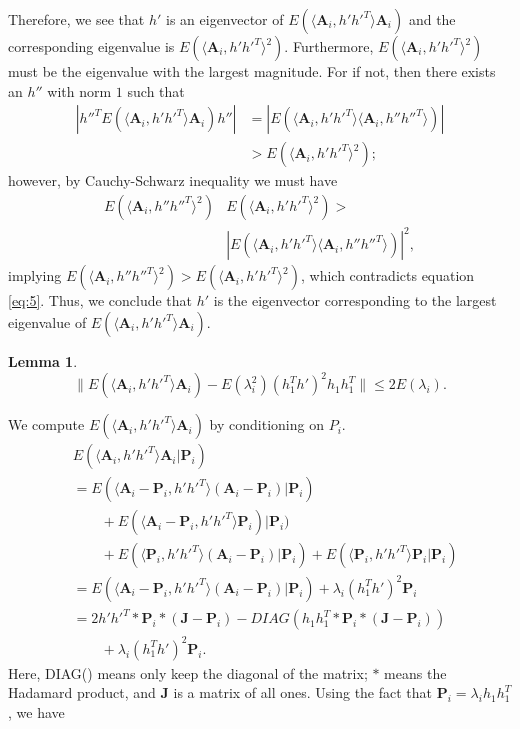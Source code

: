 \documentclass[10pt,journal,compsoc]{IEEEtran}
\newtheorem{lemma}[theorem]{Lemma}
\newenvironment{proof}[1][Proof]{\begin{trivlist}
		\item[\hskip \labelsep {\bfseries #1}]}{\end{trivlist}}
\newcommand{\bA}{\mathbf{A}}
\newcommand{\bP}{\mathbf{P}}
\newcommand{\bJ}{\mathbf{J}}
\begin{document}
\begin{proof} [Proof of Theorem 4.2]
\begin{equation}
	\end{equation}
	Therefore, we see that $h'$ is an eigenvector of $E(\langle \bA_{i},h' h'^T \rangle \bA_{i})$ and the corresponding eigenvalue is $E(\langle \bA_{i},h' h'^T \rangle ^2)$. Furthermore, $E(\langle \bA_{i},h' h'^T \rangle ^2)$ must be the eigenvalue with the largest magnitude. For if not, then there exists an $h''$ with norm $1$ such that
	\begin{align*}  | h''^T E(\langle \bA_{i},h' h'^T \rangle \bA_{i}) h''| &= |E(\langle \bA_{i},h' h'^T \rangle \langle \bA_{i},h'' h''^T \rangle)| \\
	&> E(\langle \bA_{i},h' h'^T \rangle ^2);
	\end{align*}
	however, by Cauchy-Schwarz inequality we must have
	\begin{align*} E(\langle \bA_{i},h'' h''^T \rangle^2) & E(\langle \bA_{i},h' h'^T \rangle^2) > \\
	&|E(\langle \bA_{i},h' h'^T \rangle \langle \bA_{i},h'' h''^T \rangle)|^2,
	\end{align*}
	implying $E(\langle \bA_{i},h'' h''^T \rangle^2) > E(\langle \bA_{i},h' h'^T \rangle^2)$, which contradicts equation \eqref{eq:5}. Thus, we conclude that $h'$ is the eigenvector corresponding to the largest eigenvalue of $E(\langle \bA_{i},h' h'^T \rangle \bA_{i})$. \\
\begin{lemma}
\[	\|E(\langle \bA_{i},h' h'^T \rangle \bA_{i} ) - E(\lambda_i^2) (h_1^Th')^2 h_1 h_1^T\| \leq 2 E(\lambda_i).\]
\end{lemma}	
	We compute $E(\langle \bA_{i},h' h'^T \rangle \bA_{i})$ by conditioning on $P_i$.
	\begin{align*}
	&E(\langle \bA_{i},h' h'^T \rangle \bA_{i}|\bP_i)    \\
	&=E( \langle \bA_{i}-\bP_i,h' h'^T \rangle (\bA_{i}-\bP_i)|\bP_i)\\
	&\qquad {}+E(\langle \bA_{i}-\bP_i,h' h'^T \rangle \bP_i)|\bP_i) \\
	&\qquad {} +E(\langle \bP_i,h' h'^T \rangle (\bA_{i}-\bP_i)|\bP_i)+E(\langle \bP_i,h' h'^T \rangle \bP_i|\bP_i) \\
	&= E(\langle \bA_{i}-\bP_i,h' h'^T \rangle (\bA_{i}-\bP_i)|\bP_i) + \lambda_i (h_1^Th')^2 \bP_i \\
	&=  2h' h'^T *\bP_i*(\bJ-\bP_i) - DIAG(h_1 h_1^T *\bP_i*(\bJ-\bP_i)) 	\\
	&\qquad {}+\lambda_i (h_1^Th')^2 \bP_i .
	\end{align*}
	Here, DIAG() means only keep the diagonal of the matrix; $*$ means the Hadamard product, and $\bJ$ is a matrix of all ones. Using the fact that $\bP_i=\lambda_i h_1 h_1 ^T$, we have 

\end{proof}
\end{document}
